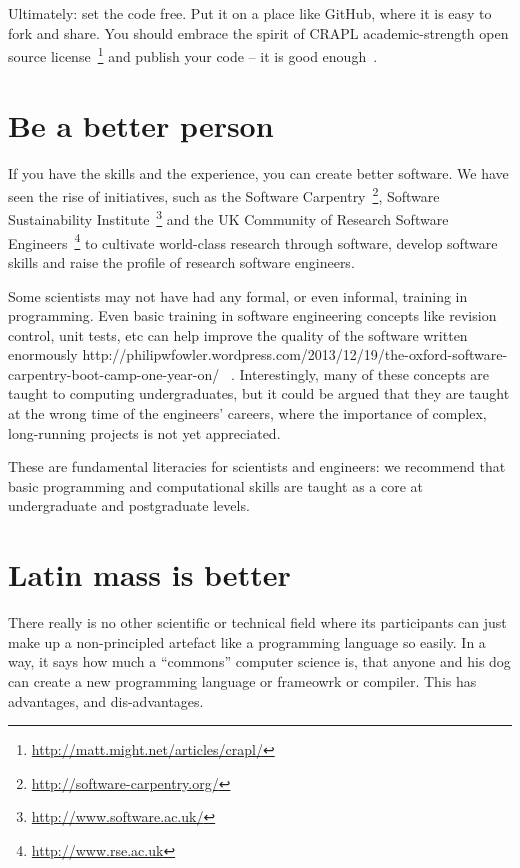 \documentclass[conference]{IEEEtran}
\begin{document}
Ultimately: set the code free. Put it on a place like GitHub, where it
is easy to fork and share. You should embrace the spirit of CRAPL
academic-strength open source
license~\footnote{\url{http://matt.might.net/articles/crapl/}} and
publish your code -- it is good enough~\cite{barnes:2010}.


\section{Be a better person}

If you have the skills and the experience, you can create better
software. We have seen the rise of initiatives, such as the Software
Carpentry~\footnote{\url{http://software-carpentry.org/}}, Software
Sustainability Institute~\footnote{\url{http://www.software.ac.uk/}}
and the UK Community of Research Software
Engineers~\footnote{\url{http://www.rse.ac.uk}} to cultivate
world-class research through software, develop software skills and
raise the profile of research software engineers.

Some scientists may not have had any formal, or even informal,
training in programming. Even basic training in software engineering
concepts like revision control, unit tests, etc can help improve the
quality of the software written enormously
http://philipwfowler.wordpress.com/2013/12/19/the-oxford-software-carpentry-boot-camp-one-year-on/
~\cite{Wilson2014}.  Interestingly, many of these concepts are taught
to computing undergraduates, but it could be argued that they are
taught at the wrong time of the engineers' careers, where the
importance of complex, long-running projects is not yet appreciated.

These are fundamental literacies for scientists and engineers: we
recommend that basic programming and computational skills are taught
as a core at undergraduate and postgraduate levels.


\section{Latin mass is better}

There really is no other scientific or technical field where its
participants can just make up a non-principled artefact like a
programming language so easily. In a way, it says how much a
``commons'' computer science is, that anyone and his dog can create a
new programming language or frameowrk or compiler. This has
advantages, and dis-advantages.
\end{document}
